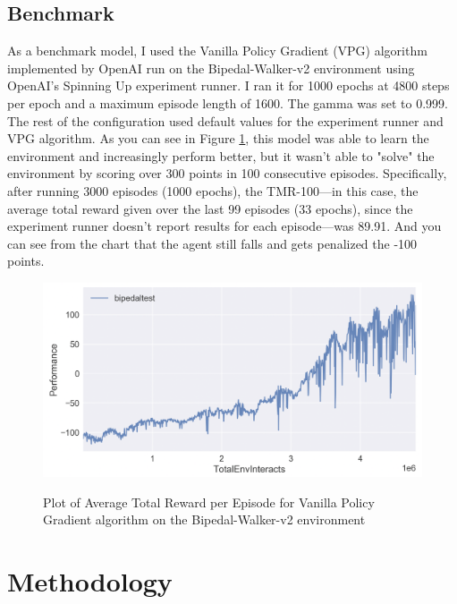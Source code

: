 \documentclass{article}
\begin{document}
\subsection{Benchmark}
As a benchmark model, I used the Vanilla Policy Gradient (VPG) algorithm implemented by OpenAI run on the Bipedal-Walker-v2 environment using OpenAI's Spinning Up experiment runner. I ran it for 1000 epochs at 4800 steps per epoch and a maximum episode length of 1600. The gamma was set to 0.999. The rest of the configuration used default values for the experiment runner and VPG algorithm. As you can see in Figure \ref{fig:benchmark_results}, this model was able to learn the environment and increasingly perform better, but it wasn't able to "solve" the environment by scoring over 300 points in 100 consecutive episodes. Specifically, after running 3000 episodes (1000 epochs), the TMR-100—in this case, the average total reward given over the last 99 episodes (33 epochs), since the experiment runner doesn't report results for each episode—was 89.91. And you can see from the chart that the agent still falls and gets penalized the -100 points. 

\begin{figure}[ht]
\caption{Plot of Average Total Reward per Episode for Vanilla Policy Gradient algorithm on the Bipedal-Walker-v2 environment}
\centering
\includegraphics[scale=0.4]{images/bipedal-vpg-performance-plot.png}
\label{fig:benchmark_results}
\end{figure}


\section{Methodology}
\label{sec:methodology}
\end{document}
